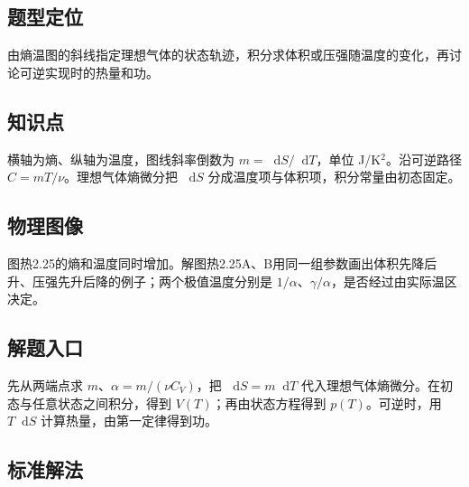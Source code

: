 \documentclass[UTF8,fontset=fandol,a4paper,11pt]{ctexart}
\newcommand{\dd}{\mathop{}\!\mathrm{d}}
\begin{document}


\subsection*{题型定位}

由熵温图的斜线指定理想气体的状态轨迹，积分求体积或压强随温度的变化，再讨论可逆实现时的热量和功。



\subsection*{知识点}

横轴为熵、纵轴为温度，图线斜率倒数为 $m=\dd S/\dd T$，单位 J/K$^2$。沿可逆路径 $C=mT/\nu$。理想气体熵微分把 $\dd S$ 分成温度项与体积项，积分常量由初态固定。




\subsection*{物理图像}

图热2.25的熵和温度同时增加。解图热2.25A、B用同一组参数画出体积先降后升、压强先升后降的例子；两个极值温度分别是 $1/\alpha$、$\gamma/\alpha$，是否经过由实际温区决定。



\subsection*{解题入口}

先从两端点求 $m$、$\alpha=m/(\nu C_V)$，把 $\dd S=m\dd T$ 代入理想气体熵微分。在初态与任意状态之间积分，得到 $V(T)$；再由状态方程得到 $p(T)$。可逆时，用 $T\dd S$ 计算热量，由第一定律得到功。




\subsection*{标准解法}
\end{document}
